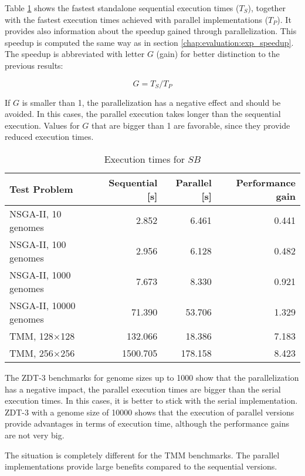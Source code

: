 Table \ref{table:sequential-runtimes} shows the fastest standalone sequential execution times ($T_S$), together with the fastest execution times achieved with parallel implementations ($T_P$). It provides also information about the speedup gained through parallelization. This speedup is computed the same way as in section \ref{chap:evaluation:exp_speedup}. The speedup is abbreviated with letter $G$ (gain) for better distinction to the previous results:

\begin{equation}
G = T_S / T_P 
\end{equation}

If $G$ is smaller than 1, the parallelization has a negative effect and should be avoided. In this cases, the parallel execution takes longer than the sequential execution. Values for $G$ that are bigger than 1 are favorable, since they provide reduced execution times.

\begin{table}
  \centering
  \caption[Execution times for standalone sequential implementations]{Execution times for $SB$}
  \begin{tabular}{lrrr}\toprule[2pt]
    Test Problem &  Sequential [s] & Parallel [s] & Performance gain \\ \midrule
    NSGA-II, 10 genomes & 2.852 & 6.461 & 0.441 \\
    NSGA-II, 100 genomes & 2.956 & 6.128 & 0.482 \\
    NSGA-II, 1000 genomes & 7.673 & 8.330 & 0.921 \\
    NSGA-II, 10000 genomes & 71.390 & 53.706 & 1.329 \\
    TMM, 128$\times$128 & 132.066 & 18.386 & 7.183 \\
    TMM, 256$\times$256 & 1500.705 & 178.158 & 8.423 \\ \bottomrule[2pt]
  \end{tabular}
  \label{table:sequential-runtimes}
\end{table}

The ZDT-3 benchmarks for genome sizes up to 1000 show that the parallelization has a negative impact, the parallel execution times are bigger than the serial execution times. In this cases, it is better to stick with the serial implementation. ZDT-3 with a genome size of 10000 shows that the execution of parallel versions provide advantages in terms of execution time, although the performance gains are not very big.

The situation is completely different for the TMM benchmarks. The parallel implementations provide large benefits compared to the sequential versions.


